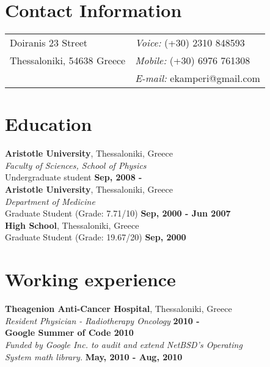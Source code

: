 \documentclass[margin,line]{res}
\begin{document}

\begin{resume}
\section{\sc Contact Information}
\vspace{.05in}
\begin{tabular}{@{}p{2in}p{4in}}
Doiranis 23 Street           & {\it Voice:}   (+30) 2310 848593 \\
Thessaloniki, 54638 Greece   & {\it Mobile:}  (+30) 6976 761308 \\
                             & {\it E-mail:}  ekamperi@gmail.com\\
\end{tabular}

\section{\sc Education}
{\bf Aristotle University}, Thessaloniki, Greece\\
{\em Faculty of Sciences, School of Physics}\\
Undergraduate student \hfill {\bf Sep, 2008 - }\\

{\bf Aristotle University}, Thessaloniki, Greece\\
{\em Department of Medicine}\\
Graduate Student (Grade: 7.71/10) \hfill {\bf Sep, 2000 - Jun 2007}\\

{\bf High School}, Thessaloniki, Greece\\
Graduate Student (Grade: 19.67/20) \hfill {\bf Sep, 2000}\\

\section{\sc Working experience}
{\bf Theagenion Anti-Cancer Hospital}, Thessaloniki, Greece\\
{\em Resident Physician - Radiotherapy Oncology}
\hfill {\bf 2010 - }\\

{\bf Google Summer of Code 2010}\\
{\em Funded by Google Inc. to audit and extend NetBSD's Operating\\ System math library.}
\hfill {\bf May, 2010 - Aug, 2010}\\


\end{resume}
\end{document}
